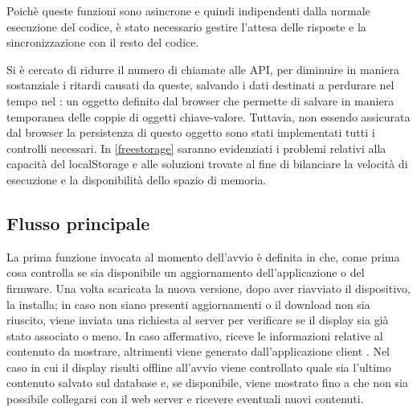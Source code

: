 Poichè queste funzioni sono asincrone e quindi indipendenti dalla normale esecuzione del codice, è stato necessario gestire l'attesa delle risposte e la sincronizzazione con il resto del codice.


Si è cercato di ridurre il numero di chiamate alle API, per diminuire in maniera sostanziale i ritardi causati da queste, salvando i dati destinati a perdurare nel tempo nel : un oggetto definito dal browser che permette di salvare in maniera temporanea delle coppie di oggetti chiave-valore. Tuttavia, non essendo assicurata dal browser la persistenza di questo oggetto sono stati implementati tutti i controlli necessari. In \ref*{freestorage} saranno evidenziati i problemi relativi alla capacità del localStorage e alle soluzioni trovate al fine di bilanciare la velocità di esecuzione e la disponibilità dello spazio di memoria.

\subsection{Flusso principale}\label{flusso_principale}

La prima funzione invocata al momento dell'avvio è  definita in  che, come prima cosa controlla se sia disponibile un aggiornamento dell'applicazione o del firmware. Una volta scaricata la nuova versione, dopo aver riavviato il dispositivo, la installa; in caso non siano presenti aggiornamenti o il download non sia riuscito, viene inviata una richiesta al server per verificare se il display sia già stato associato o meno. In caso affermativo, riceve le informazioni relative al contenuto da mostrare, altrimenti viene generato dall'applicazione client . Nel caso in cui il display risulti offline all'avvio viene controllato quale sia l'ultimo contenuto salvato sul database e, se disponibile, viene mostrato fino a che non sia possibile collegarsi con il web server e ricevere eventuali nuovi contenuti.


